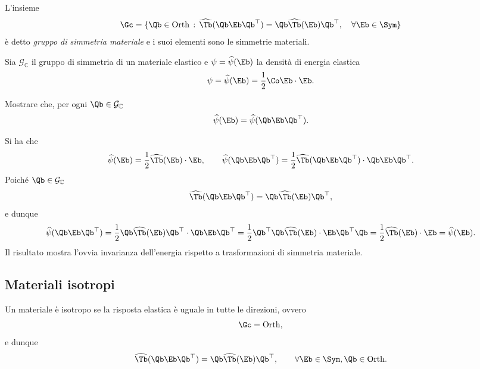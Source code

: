L'insieme
\begin{equation}
	\Gc =\{ \Qb \in {\rm Orth}\, :\, \widehat{\Tb}(\Qb \Eb \Qb ^\top)=\Qb \widehat{\Tb}(\Eb)\Qb ^\top, \quad \forall \Eb \in \Sym  \}
\end{equation}
è detto \textit{gruppo di simmetria materiale} e i suoi elementi sono le simmetrie materiali.




\begin{exercise}
	Sia $\mathcal{G}_{\mathbb{C}}$ il gruppo di simmetria  di un materiale elastico e $\psi=\widehat\psi(\Eb)$ la densità di energia elastica
	\begin{equation}
		\psi=\widehat\psi(\Eb)=\frac12 \Co\Eb\cdot\Eb.
	\end{equation}
	
	Mostrare che, per ogni $\Qb\in\mathcal{G}_{\mathbb{C}}$
	\begin{equation}
		\widehat\psi(\Eb)=	\widehat\psi(\Qb\Eb\Qb^\top).
	\end{equation}
	
	\begin{svolgimento}
		Si ha che
		\begin{equation}
			\widehat{\psi}(\Eb)=\frac{1}{2}\widehat{\Tb}(\Eb)\cdot \Eb, \qquad \widehat{\psi}(\Qb\Eb\Qb^\top)=\frac{1}{2}\widehat{\Tb}(\Qb\Eb\Qb^\top)\cdot \Qb\Eb\Qb^\top.
		\end{equation}
		Poiché $\Qb \in \mathcal{G}_{\mathbb{C}}$
		\begin{equation}
			\widehat{\Tb}(\Qb\Eb\Qb^\top)=\Qb\widehat{\Tb}(\Eb)\Qb^\top,
		\end{equation}
		e dunque
		\begin{equation}
			\widehat{\psi}(\Qb\Eb\Qb^\top)=\frac12\Qb\widehat{\Tb}(\Eb)\Qb^\top\cdot  \Qb\Eb\Qb^\top=\frac12 \Qb^\top\Qb \widehat{\Tb}(\Eb)\cdot \Eb \Qb^\top\Qb=\frac{1}{2}\widehat{\Tb}(\Eb)\cdot \Eb=\widehat{\psi}(\Eb).
		\end{equation}
		Il risultato mostra l'ovvia invarianza dell'energia rispetto a trasformazioni di simmetria materiale.
	\end{svolgimento}
	
\end{exercise}


\subsection{Materiali isotropi}
Un materiale è isotropo se la risposta elastica  è uguale in tutte le direzioni, ovvero
\begin{equation}
	\Gc ={\rm Orth},
\end{equation}
e dunque
\begin{equation}
	\widehat{\Tb}(\Qb \Eb \Qb ^\top)=\Qb \widehat{\Tb}(\Eb)\Qb ^\top, \qquad \forall \Eb \in \Sym, \Qb \in {\rm Orth}.
\end{equation}



